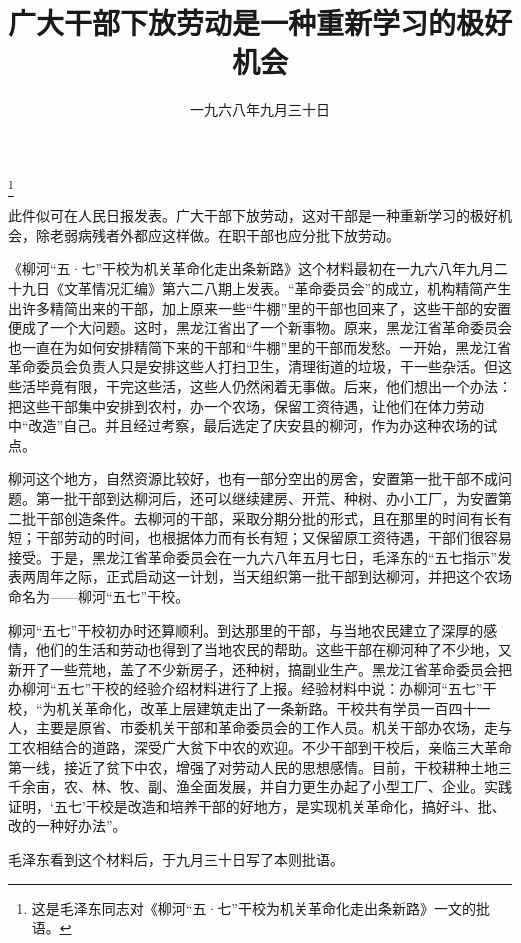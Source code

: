 
\title{广大干部下放劳动是一种重新学习的极好机会}
\date{一九六八年九月三十日}
\thanks{这是毛泽东同志对《柳河“五·七”干校为机关革命化走出条新路》一文的批语。}
\maketitle


此件似可在人民日报发表。广大干部下放劳动，这对干部是一种重新学习的极好机会，除老弱病残者外都应这样做。在职干部也应分批下放劳动。

\begin{maonote}
《柳河“五·七”干校为机关革命化走出条新路》这个材料最初在一九六八年九月二十九日《文革情况汇编》第六二八期上发表。“革命委员会”的成立，机构精简产生出许多精简出来的干部，加上原来一些“牛棚”里的干部也回来了，这些干部的安置便成了一个大问题。这时，黑龙江省出了一个新事物。原来，黑龙江省革命委员会也一直在为如何安排精简下来的干部和“牛棚”里的干部而发愁。一开始，黑龙江省革命委员会负责人只是安排这些人打扫卫生，清理街道的垃圾，干一些杂活。但这些活毕竟有限，干完这些活，这些人仍然闲着无事做。后来，他们想出一个办法：把这些干部集中安排到农村，办一个农场，保留工资待遇，让他们在体力劳动中“改造”自己。并且经过考察，最后选定了庆安县的柳河，作为办这种农场的试点。

柳河这个地方，自然资源比较好，也有一部分空出的房舍，安置第一批干部不成问题。第一批干部到达柳河后，还可以继续建房、开荒、种树、办小工厂，为安置第二批干部创造条件。去柳河的干部，采取分期分批的形式，且在那里的时间有长有短；干部劳动的时间，也根据体力而有长有短；又保留原工资待遇，干部们很容易接受。于是，黑龙江省革命委员会在一九六八年五月七日，毛泽东的“五七指示”发表两周年之际，正式启动这一计划，当天组织第一批干部到达柳河，并把这个农场命名为——柳河“五七”干校。

柳河“五七”干校初办时还算顺利。到达那里的干部，与当地农民建立了深厚的感情，他们的生活和劳动也得到了当地农民的帮助。这些干部在柳河种了不少地，又新开了一些荒地，盖了不少新房子，还种树，搞副业生产。黑龙江省革命委员会把办柳河“五七”干校的经验介绍材料进行了上报。经验材料中说：办柳河“五七”干校，“为机关革命化，改革上层建筑走出了一条新路。干校共有学员一百四十一人，主要是原省、市委机关干部和革命委员会的工作人员。机关干部办农场，走与工农相结合的道路，深受广大贫下中农的欢迎。不少干部到干校后，亲临三大革命第一线，接近了贫下中农，增强了对劳动人民的思想感情。目前，干校耕种土地三千余亩，农、林、牧、副、渔全面发展，并自力更生办起了小型工厂、企业。实践证明，‘五七’干校是改造和培养干部的好地方，是实现机关革命化，搞好斗、批、改的一种好办法”。

毛泽东看到这个材料后，于九月三十日写了本则批语。


\end{maonote}
